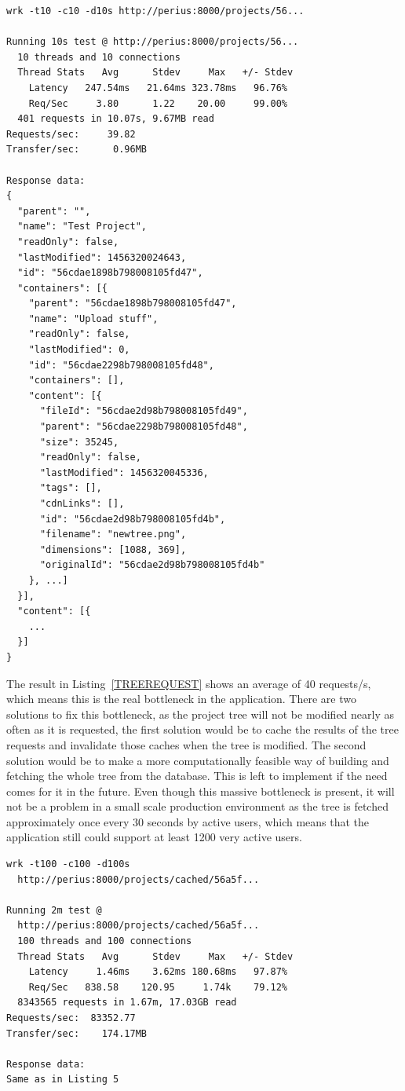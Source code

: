 \documentclass[a4paper,12pt]{article}
\begin{document}
\begin{minipage}{\linewidth-1cm}
\begin{lstlisting}[label=TREEREQUEST,caption=Result of project tree requests]
wrk -t10 -c10 -d10s http://perius:8000/projects/56...
 
Running 10s test @ http://perius:8000/projects/56...
  10 threads and 10 connections
  Thread Stats   Avg      Stdev     Max   +/- Stdev
    Latency   247.54ms   21.64ms 323.78ms   96.76%
    Req/Sec     3.80      1.22    20.00     99.00%
  401 requests in 10.07s, 9.67MB read
Requests/sec:     39.82
Transfer/sec:      0.96MB

Response data:
{
  "parent": "",
  "name": "Test Project",
  "readOnly": false,
  "lastModified": 1456320024643,
  "id": "56cdae1898b798008105fd47",
  "containers": [{
    "parent": "56cdae1898b798008105fd47",
    "name": "Upload stuff",
    "readOnly": false,
    "lastModified": 0,
    "id": "56cdae2298b798008105fd48",
    "containers": [],
    "content": [{
      "fileId": "56cdae2d98b798008105fd49",
      "parent": "56cdae2298b798008105fd48",
      "size": 35245,
      "readOnly": false,
      "lastModified": 1456320045336,
      "tags": [],
      "cdnLinks": [],
      "id": "56cdae2d98b798008105fd4b",
      "filename": "newtree.png",
      "dimensions": [1088, 369],
      "originalId": "56cdae2d98b798008105fd4b"
    }, ...]
  }],
  "content": [{
    ...
  }]
}
\end{lstlisting}
\end{minipage}

The result in Listing~\ref{TREEREQUEST} shows an average of 40 requests/s, which means this is the
real bottleneck in the application. There are two solutions to fix this bottleneck, as the project
tree will not be modified nearly as often as it is requested, the first solution would be to cache
the results of the tree requests and invalidate those caches when the tree is modified. The second
solution would be to make a more computationally feasible way of building and fetching the whole
tree from the database. This is left to implement if the need comes for it in the future. Even
though this massive bottleneck is present, it will not be a problem in a small scale production
environment as the tree is fetched approximately once every 30 seconds by active users, which means
that the application still could support at least 1200 very active users.

\begin{minipage}{\linewidth-1cm}
\begin{lstlisting}[label=CACHEREQUEST,caption=Result of cached project tree requests]
wrk -t100 -c100 -d100s 
  http://perius:8000/projects/cached/56a5f...
 
Running 2m test @ 
  http://perius:8000/projects/cached/56a5f...
  100 threads and 100 connections
  Thread Stats   Avg      Stdev     Max   +/- Stdev
    Latency     1.46ms    3.62ms 180.68ms   97.87%
    Req/Sec   838.58    120.95     1.74k    79.12%
  8343565 requests in 1.67m, 17.03GB read
Requests/sec:  83352.77
Transfer/sec:    174.17MB

Response data:
Same as in Listing 5
\end{lstlisting}
\end{minipage}
\end{document}

